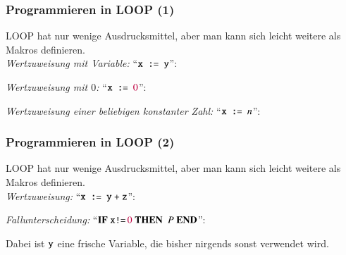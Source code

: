 \documentclass[onlymath]{beamer}
\begin{document}
\begin{frame}[t]\frametitle{Programmieren in LOOP (1)}

LOOP hat nur wenige Ausdrucksmittel, aber man kann sich leicht weitere als Makros definieren.\\[1ex]

\emph{Wertzuweisung mit Variable:} ``$\texttt{x}\texttt{ := } \texttt{y}$'':\pause

\bigskip\pause

\emph{Wertzuweisung mit $0$:} ``$\texttt{x}\texttt{ := } \textcolor{purple}{0}$'':\pause

\bigskip\pause

\emph{Wertzuweisung einer beliebigen konstanter Zahl:} ``$\texttt{x}\texttt{ := } n$'':\pause


\end{frame}

\begin{frame}[t]\frametitle{Programmieren in LOOP (2)}

LOOP hat nur wenige Ausdrucksmittel, aber man kann sich leicht weitere als Makros definieren.\\[1ex]

\emph{Wertzuweisung:} ``$\texttt{x}\texttt{ := } \texttt{y}~\texttt{+}~\texttt{z}$'':\pause

\bigskip\pause


\emph{Fallunterscheidung:} ``$\textbf{IF}~\texttt{x}\texttt{!=}\,\textcolor{purple}{0}~\textbf{THEN}~~P~\textbf{END}$'':\pause

\medskip

Dabei ist $\texttt{y}$ eine frische Variable, die bisher nirgends sonst verwendet wird.


\end{frame}
\end{document}
